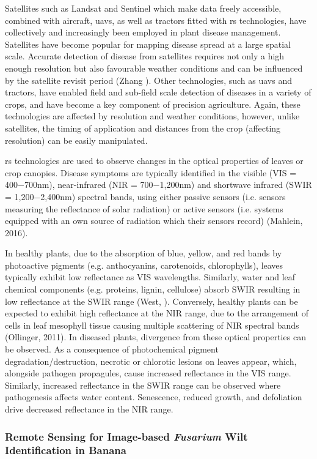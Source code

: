 Satellites such as Landsat and Sentinel which make data freely accessible, combined with aircraft, \acp{uav}, as well as tractors fitted with \ac{rs} technologies, have collectively and increasingly been employed in plant disease management. Satellites have become popular for mapping disease spread at a large spatial scale. Accurate detection of disease from satellites requires not only a high enough resolution but also favourable weather conditions and can be influenced by the satellite revisit period (Zhang ). Other technologies, such as \acp{uav} and tractors, have enabled field and sub-field scale detection of diseases in a variety of crops, and have become a key component of precision agriculture. Again, these technologies are affected by resolution and weather conditions, however, unlike satellites, the timing of application and distances from the crop (affecting resolution) can be easily manipulated.  

\Ac{rs} technologies are used to observe changes in the optical properties of leaves or crop canopies. Disease symptoms are typically identified in the visible (VIS = 400−700nm), near-infrared (NIR = 700−1,200nm) and shortwave infrared (SWIR = 1,200−2,400nm) spectral bands, using either passive sensors (i.e. sensors measuring the reflectance of solar radiation) or active sensors (i.e. systems equipped with an own source of radiation which their sensors record) (Mahlein, 2016).  

In healthy plants, due to the absorption of blue, yellow, and red bands by photoactive pigments (e.g. anthocyanins, carotenoids, chlorophylls), leaves typically exhibit low reflectance as VIS wavelengths. Similarly, water and leaf chemical components (e.g. proteins, lignin, cellulose) absorb SWIR resulting in low reflectance at the SWIR range (West, ). Conversely, healthy plants can be expected to exhibit high reflectance at the NIR range, due to the arrangement of cells in leaf mesophyll tissue causing multiple scattering of NIR spectral bands (Ollinger, 2011). In diseased plants, divergence from these optical properties can be observed. As a consequence of photochemical pigment degradation/destruction, necrotic or chlorotic lesions on leaves appear, which, alongside pathogen propagules, cause increased reflectance in the VIS range. Similarly, increased reflectance in the SWIR range can be observed where pathogenesis affects water content. Senescence, reduced growth, and defoliation drive decreased reflectance in the NIR range.   


\subsubsection{Remote Sensing for Image-based \textit{Fusarium} Wilt Identification in Banana}

